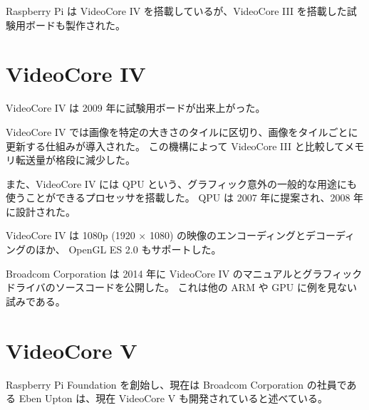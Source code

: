 \documentclass{jsarticle}
\begin{document}
Raspberry Pi は VideoCore IV を搭載しているが、VideoCore III を搭載した試験用ボードも製作された。

\section{VideoCore IV}
VideoCore IV は 2009 年に試験用ボードが出来上がった。

VideoCore IV では画像を特定の大きさのタイルに区切り、画像をタイルごとに更新する仕組みが導入された。
この機構によって VideoCore III と比較してメモリ転送量が格段に減少した。

また、VideoCore IV には QPU という、グラフィック意外の一般的な用途にも使うことができるプロセッサを搭載した。
QPU は 2007 年に提案され、2008 年に設計された。

VideoCore IV は 1080p (1920 $\times$ 1080) の映像のエンコーディングとデコーディングのほか、
OpenGL ES 2.0 もサポートした。

Broadcom Corporation は 2014 年に VideoCore IV のマニュアルとグラフィックドライバのソースコードを公開した。
これは他の ARM や GPU に例を見ない試みである。

\section{VideoCore V}
Raspberry Pi Foundation を創始し、現在は Broadcom Corporation の社員である\cite{mi1} Eben Upton は、現在 VideoCore V も開発されていると述べている。



\end{document}
